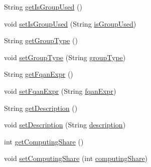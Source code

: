 \begin{DoxyCompactItemize}
\item 
String \hyperlink{classportal_1_1registration_1_1domain_1_1Fqan_ad26b2ea359dbbe832dfdf4d1cbf4e00e}{getIsGroupUsed} ()
\item 
void \hyperlink{classportal_1_1registration_1_1domain_1_1Fqan_ae956b314820c7eb5b7c5ad4ef9e285fa}{setIsGroupUsed} (String \hyperlink{classportal_1_1registration_1_1domain_1_1Fqan_a18a759a4901fefe12b28418fd4fc054c}{isGroupUsed})
\item 
String \hyperlink{classportal_1_1registration_1_1domain_1_1Fqan_a3e60acf2bec9aaf194b804bcc4b09f60}{getGroupType} ()
\item 
void \hyperlink{classportal_1_1registration_1_1domain_1_1Fqan_a26979568db4068d1eec3ef4a041b3306}{setGroupType} (String \hyperlink{classportal_1_1registration_1_1domain_1_1Fqan_ab172b872fc284fb1f5c0ebb198a5c98a}{groupType})
\item 
String \hyperlink{classportal_1_1registration_1_1domain_1_1Fqan_af304fd20c77c23d5823d8c7aa2f11b7c}{getFqanExpr} ()
\item 
void \hyperlink{classportal_1_1registration_1_1domain_1_1Fqan_a20a8c757a8140ba4cc58577fc930b558}{setFqanExpr} (String \hyperlink{classportal_1_1registration_1_1domain_1_1Fqan_a8fee3ab195a29cf4e56f5b7ea9226e3a}{fqanExpr})
\item 
String \hyperlink{classportal_1_1registration_1_1domain_1_1Fqan_a0119bdaedcd4bef972a7ae28672dcc1f}{getDescription} ()
\item 
void \hyperlink{classportal_1_1registration_1_1domain_1_1Fqan_ab1f252b20a538884260605af476154eb}{setDescription} (String \hyperlink{classportal_1_1registration_1_1domain_1_1Fqan_a75b560547e2591fb42c279e8b1bcc782}{description})
\item 
int \hyperlink{classportal_1_1registration_1_1domain_1_1Fqan_aee6b31ad41b4c61c2a74dd5a2c08c386}{getComputingShare} ()
\item 
void \hyperlink{classportal_1_1registration_1_1domain_1_1Fqan_a150fcca5af17a5c0f0d47b985789806a}{setComputingShare} (int \hyperlink{classportal_1_1registration_1_1domain_1_1Fqan_a05ebf08182a037b4cbb4b27053e76ebc}{computingShare})
\end{DoxyCompactItemize}
